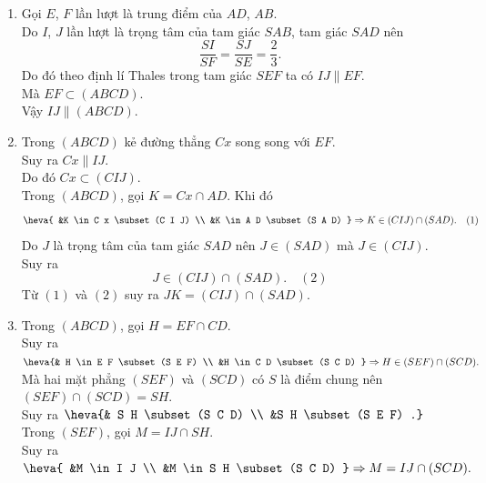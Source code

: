 \begin{bt}
\begin{bt}
{\begin{enumerate}
			Vậy $(SAB)\cap (ABCD)=AB$.
			\item Gọi $E$, $F$ lần lượt là trung điểm của $AD$, $AB$.\\
			Do $I$, $J$ lần lượt là trọng tâm của tam giác $SAB$, tam giác $SAD$ nên
			$$\dfrac{SI}{SF}=\dfrac{SJ}{SE}=\dfrac{2}{3}.$$
			Do đó theo định lí Thales trong tam giác $SEF$ ta có $IJ \parallel EF$.\\
			Mà $EF\subset (ABCD)$.\\
			Vậy $IJ\parallel (ABCD)$.
			\item Trong $(A B C D)$ kẻ đường thẳng $C x$ song song với $E F$.\\
			Suy ra $C x \parallel I J$.\\
			Do đó $C x \subset(C I J)$.\\
			Trong  $(A B C D)$, gọi $K=C x \cap A D$.
			Khi đó $$\heva{
				&K \in C x \subset(C I J) \\
				&K \in A D \subset(S A D)
			} \Rightarrow K \in(C I J) \cap(S A D).\quad (1)
			$$
			Do $J$ là trọng tâm của tam giác $SAD$ nên $J \in(S A D)$ mà $J \in(C I J)$.\\
			Suy ra 
			$$ J \in(C I J) \cap(S A D).\quad(2)$$
			Từ $(1)$ và $(2)$ suy ra $J K=(C I J) \cap(S A D)$.
			\item Trong $(A B C D)$,   gọi $H=E F \cap C D$. \\
			Suy ra $\heva{&
				H \in E F \subset(S E F) \\
				&H \in C D \subset(S C D)
			} \Rightarrow H \in(S E F) \cap(S C D).$\\
			Mà hai mặt phẳng $(S E F)$ và $(S C D)$ có  $S $ là điểm chung nên $(S E F) \cap(S C D)=S H$. \\
			Suy ra $\heva{&
				S H \subset(S C D) \\
				&S H \subset(S E F)
				.}$\\
			Trong $(SEF)$, gọi $M=I J \cap S H$. \\
			Suy ra $\heva{
				&M \in I J \\
				&M \in S H \subset(S C D)
			} \Rightarrow M=I J \cap(S C D).$
		\end{enumerate}
	}
\end{bt}


\end{bt}
